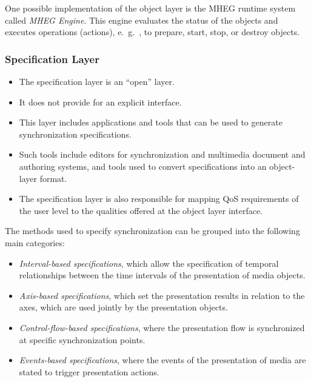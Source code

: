 One possible implementation of the object layer is the MHEG runtime system called \textit{MHEG Engine}. This engine evaluates the status of the objects and executes operations
(actions), e.\ g.\ , to prepare, start, stop, or destroy objects.

\subsubsection{Specification Layer}
\begin{multicols}{2}
\begin{itemize}
	\item The specification layer is an ``open'' layer. 
	\item It does not provide for an explicit interface.
	\item This layer includes applications and tools that can be used to generate synchronization specifications.
	\item Such tools include editors for synchronization and multimedia document and authoring systems, and tools used to convert specifications into an object-layer format.
	\item The specification layer is also responsible for mapping QoS requirements of the user level to the qualities offered at the object layer interface.
\end{itemize}
\end{multicols}

The methods used to specify synchronization can be grouped into the following main categories:

\begin{itemize}
	\item \textit{Interval-based specifications}, which allow the specification of temporal relationships between the time intervals of the presentation of media objects.
	\item \textit{Axis-based specifications}, which set the presentation results in relation to the axes, which are used jointly by the presentation objects.
	\item \textit{Control-flow-based specifications}, where the presentation flow is synchronized at specific synchronization points.
	\item \textit{Events-based specifications}, where the events of the presentation of media are stated to trigger presentation actions.
\end{itemize}	



